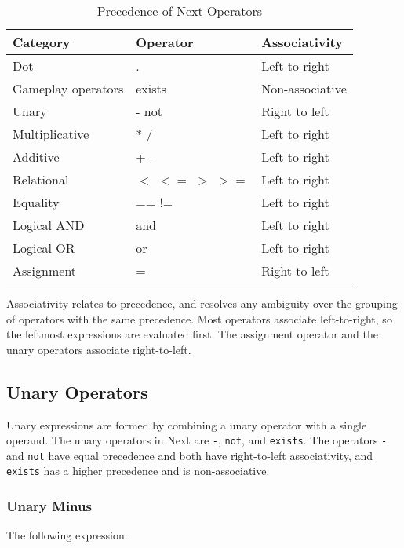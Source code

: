 \documentclass[12pt]{article}
\begin{document}
\begin{table}[htdp]
\caption{Precedence of Next Operators}
\begin{center}
\begin{tabular}{|l|l|l|}
\hline
\textbf{Category} & \textbf{Operator} & \textbf{Associativity} \\
\hline 
Dot & . & Left to right \\
\hline
Gameplay operators & exists & Non-associative \\
\hline
Unary & - not & Right to left \\
\hline
Multiplicative & * / & Left to right \\
\hline
Additive & + - & Left to right \\
\hline
Relational & $<$ $<=$ $>$ $>=$ & Left to right \\
\hline
Equality & == != & Left to right \\
\hline
Logical AND & and & Left to right \\
\hline
Logical OR & or & Left to right \\
\hline
Assignment & = & Right to left \\
\hline
\end{tabular}
\end{center}
\label{precedence}
\end{table} 

\noindent Associativity relates to precedence, and resolves any ambiguity over the grouping of operators with the same precedence.  Most operators associate left-to-right, so the leftmost expressions are evaluated first.  The assignment operator  and the unary operators associate right-to-left.

\subsection{Unary Operators}
Unary expressions are formed by combining a unary operator with a single operand.  The unary operators in Next are \texttt{-}, \texttt{not}, and \texttt{exists}.  The operators \texttt{-} and \texttt{not} have equal precedence and both have right-to-left associativity, and \texttt{exists} has a higher precedence and is non-associative.

\subsubsection {Unary Minus}

The following expression: \\
\end{document}
